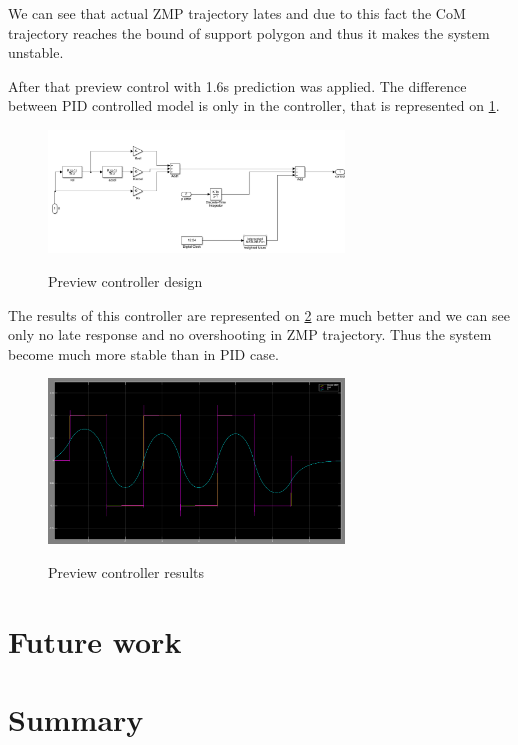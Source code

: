 \documentclass[12pt,a4paper]{report}
\begin{document}
		We can see that actual ZMP trajectory lates and due to this fact the CoM trajectory reaches the bound of support polygon and thus it makes the system unstable.
		
		After that preview control with 1.6s prediction was applied. The difference between PID controlled model is only in the controller, that is represented on \cref{fig:18}.
		
		\begin{figure}[h!]
			\vspace{-0.2cm}
			\centering
			{\includegraphics[width=0.7\textwidth]{18}}
			\caption{Preview controller design}
			\label{fig:18}
			\vspace{-0.1cm}
		\end{figure}
		
		The results of this controller are represented on \cref{fig:19} are much better and we can see only no late response and no overshooting in ZMP trajectory. Thus the system become much more stable than in PID case. 
		
		\begin{figure}[h!]
			\vspace{-0.2cm}
			\centering
			{\includegraphics[width=0.7\textwidth]{19}}
			\caption{Preview controller results}
			\label{fig:19}
			\vspace{-0.1cm}
		\end{figure}
	\chapter{Future work}
	\chapter{Summary}
	
\end{document}
